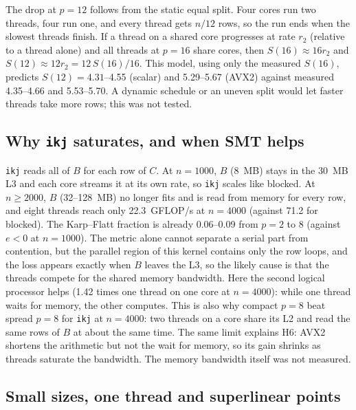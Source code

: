 \documentclass[11pt,a4paper]{article}
\begin{document}
The drop at $p = 12$ follows from the static equal split. Four cores run two threads, four
run one, and every thread gets $n/12$ rows, so the run ends when the slowest threads finish.
If a thread on a shared core progresses at rate $r_2$ (relative to a thread alone) and all
threads at $p = 16$ share cores, then $S(16) \approx 16 r_2$ and $S(12) \approx 12 r_2 =
12\,S(16)/16$. This model, using only the measured $S(16)$, predicts $S(12) = 4.31$--4.55
(scalar) and 5.29--5.67 (AVX2) against measured 4.35--4.66 and 5.53--5.70. A dynamic
schedule or an uneven split would let faster threads take more rows; this was not tested.

\subsection{Why \texttt{ikj} saturates, and when SMT helps}

\texttt{ikj} reads all of $B$ for each row of $C$. At $n = 1000$, $B$ (8~MB) stays in the
30~MB L3 and each core streams it at its own rate, so \texttt{ikj} scales like blocked. At
$n \ge 2000$, $B$ (32--128~MB) no longer fits and is read from memory for every row, and
eight threads reach only 22.3~GFLOP/s at $n = 4000$ (against 71.2 for blocked). The
Karp--Flatt fraction is already 0.06--0.09 from $p = 2$ to 8 (against $e < 0$ at
$n = 1000$). The metric alone cannot separate a serial part from contention, but the
parallel region of this kernel contains only the row loops, and the loss appears exactly
when $B$ leaves the L3, so the likely cause is that the threads compete for the shared
memory bandwidth. Here the second logical processor helps (1.42 times one thread on one core at
$n = 4000$): while one thread waits for memory, the other computes. This is also why compact
$p = 8$ beat spread $p = 8$ for \texttt{ikj} at $n = 4000$: two threads on a core share
its L2 and read the same rows of $B$ at about the same time. The same limit explains H6:
AVX2 shortens the arithmetic but not the wait for memory, so its gain shrinks as threads
saturate the bandwidth. The memory bandwidth itself was not measured.

\subsection{Small sizes, one thread and superlinear points}
\label{sec:super}
\end{document}
